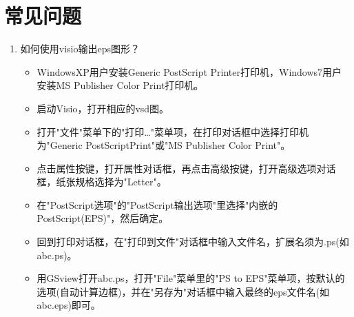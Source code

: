 \chapter{常见问题}
\begin{enumerate}
\item  如何使用visio输出eps图形？
\begin{itemize}
	\item WindowsXP用户安装Generic PostScript Printer打印机，Windows7用户安装MS Publisher Color Print打印机。
	\item 启动Visio，打开相应的vsd图。
	\item 打开"文件"菜单下的"打印\dots "菜单项，在打印对话框中选择打印机为"Generic PostScriptPrint"或"MS Publisher Color Print"。
	\item 点击属性按键，打开属性对话框，再点击高级按键，打开高级选项对话框，纸张规格选择为"Letter"。
	\item 在"PostScript选项"的"PostScript输出选项"里选择"内嵌的PostScript(EPS)"，然后确定。
	\item 回到打印对话框，在"打印到文件"对话框中输入文件名，扩展名须为.ps(如abc.ps)。
	\item 用GSview打开abc.ps，打开"File"菜单里的"PS to EPS"菜单项，按默认的选项(自动计算边框)，并在"另存为"对话框中输入最终的eps文件名(如abc.eps)即可。
\end{itemize}

\end{enumerate}